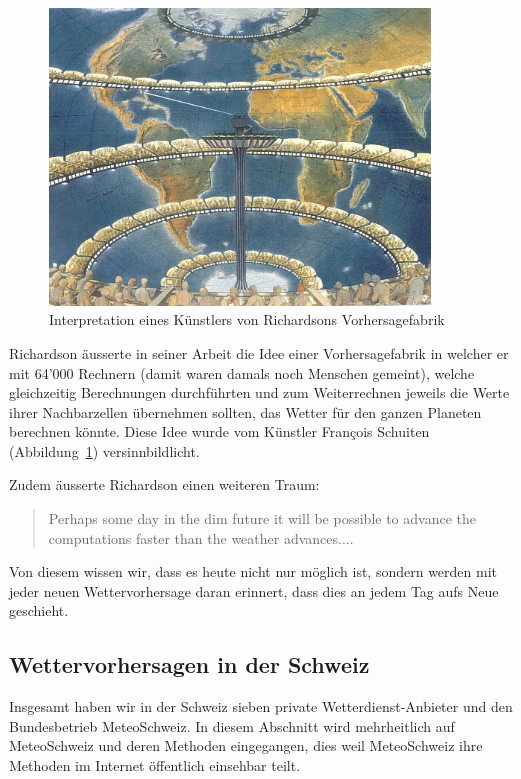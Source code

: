 \begin{refsection}
\begin{figure}
\centering
\includegraphics[width=0.9\textwidth]{klima/64000.jpg}
\caption{Interpretation eines Künstlers von Richardsons Vorhersagefabrik \cite{klima:biography}
\label{klima:geschichte:richardson}}
\end{figure}

Richardson äusserte in seiner Arbeit die Idee einer Vorhersagefabrik in welcher er mit 64'000 Rechnern (damit waren damals noch Menschen gemeint), welche gleichzeitig Berechnungen durchführten und zum Weiterrechnen jeweils die Werte ihrer Nachbarzellen übernehmen sollten, das Wetter für den ganzen Planeten berechnen könnte. Diese Idee wurde vom Künstler François Schuiten (Abbildung~\ref{klima:geschichte:richardson}) versinnbildlicht.

Zudem äusserte Richardson einen weiteren Traum:
\begin{quote}
Perhaps some day in the dim future it will be possible to advance the computations faster than the weather advances....
\end{quote}
Von diesem wissen wir, dass es heute nicht nur möglich ist, sondern werden mit jeder neuen Wettervorhersage daran erinnert, dass dies an jedem Tag aufs Neue geschieht.

\subsection{Wettervorhersagen in der Schweiz
\label{klima:section:wettervorhersagen}}

Insgesamt haben wir in der Schweiz sieben private Wetterdienst-Anbieter und den Bundesbetrieb MeteoSchweiz. In diesem Abschnitt wird mehrheitlich auf MeteoSchweiz und deren Methoden eingegangen, dies weil MeteoSchweiz ihre Methoden im Internet öffentlich einsehbar teilt.


\end{refsection}
